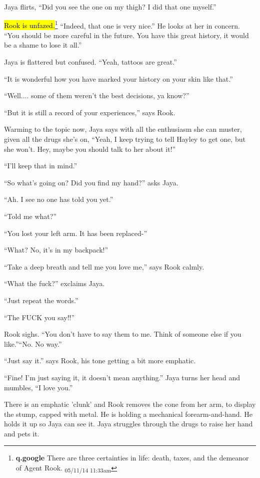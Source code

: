 Jaya flirts, ``Did you see the one on my thigh? I did that one myself.''

\hl{Rook is unfazed.}\footnote{\textbf{q.google }There are three certainties in life: death, taxes, and the demeanor of Agent Rook. \textsubscript{05/11/14 11:33am}}  ``Indeed, that one is very nice.''  He looks at her in concern.  ``You should be more careful in the future.  You have this great history, it would be a shame to lose it all.''

Jaya is flattered but confused.  ``Yeah, tattoos are great.''

``It is wonderful how you have marked your history on your skin like that.''

``Well.... some of them weren't the best decisions, ya know?''

``But it is still a record of your experiences,'' says Rook.

Warming to the topic now, Jaya says with all the enthusiasm she can muster, given all the drugs she's on, ``Yeah, I keep trying to tell Hayley to get one, but she won't.  Hey, maybe you should talk to her about it!''

``I'll keep that in mind.''

``So what's going on?  Did you find my hand?'' asks Jaya.

``Ah. I see no one has told you yet.''

``Told me what?''

``You lost your left arm.  It has been replaced-''

``What?  No, it's in my backpack!''

``Take a deep breath and tell me you love me,'' says Rook calmly.

``What the fuck?'' exclaims Jaya.

``Just repeat the words.''

``The FUCK you say!!''

Rook sighs.  ``You don't have to say them to me.  Think of someone else if you like.''``No.  No way.''

``Just say it.'' says Rook, his tone getting a bit more emphatic.

``Fine!  I'm just saying it, it doesn't mean anything.''  Jaya turns her head and mumbles, ``I love you.''

There is an emphatic 'clunk' and Rook removes the cone from her arm, to display the stump, capped with metal. He is holding a mechanical forearm-and-hand. He holds it up so Jaya can see it.  Jaya struggles through the drugs to raise her hand and pets it.

